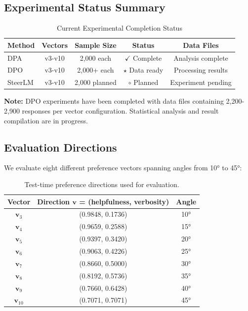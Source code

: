 \documentclass{article} %
\begin{document}
\subsection{Experimental Status Summary}

\begin{table}[t]
\centering
\caption{Current Experimental Completion Status}
\label{tab:experimental_status}
\begin{tabular}{l|c|c|c|c}
\toprule
\textbf{Method} & \textbf{Vectors} & \textbf{Sample Size} & \textbf{Status} & \textbf{Data Files} \\
\midrule
DPA & v3-v10 & 2,000 each & $\checkmark$ \textcolor[HTML]{2878b5}{Complete} & Analysis complete \\
DPO & v3-v10 & 2,000+ each & $\star$ \textcolor[HTML]{f8ac8c}{Data ready} & Processing results \\
SteerLM & v3-v10 & 2,000 planned & $\circ$ \textcolor[HTML]{ff8884}{Planned} & Experiment pending \\
\bottomrule
\end{tabular}
\end{table}

\textbf{Note:} DPO experiments have been completed with data files containing 2,200-2,900 responses per vector configuration. Statistical analysis and result compilation are in progress.

\subsection{Evaluation Directions}
We evaluate eight different preference vectors spanning angles from 10° to 45°:

\begin{table}[H]
\centering
\caption{Test-time preference directions used for evaluation.}
\label{tab:directions}
\begin{tabular}{c|c|c}
\toprule
\textbf{Vector} & \textbf{Direction $\mathbf{v}$ = (helpfulness, verbosity)} & \textbf{Angle} \\
\midrule
$\mathbf{v}_3$ & (0.9848, 0.1736) & 10° \\
$\mathbf{v}_4$ & (0.9659, 0.2588) & 15° \\
$\mathbf{v}_5$ & (0.9397, 0.3420) & 20° \\
$\mathbf{v}_6$ & (0.9063, 0.4226) & 25° \\
$\mathbf{v}_7$ & (0.8660, 0.5000) & 30° \\
$\mathbf{v}_8$ & (0.8192, 0.5736) & 35° \\
$\mathbf{v}_9$ & (0.7660, 0.6428) & 40° \\
$\mathbf{v}_{10}$ & (0.7071, 0.7071) & 45° \\
\bottomrule
\end{tabular}
\end{table}
\end{document}
